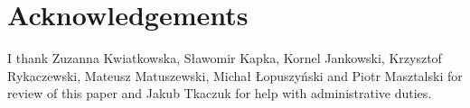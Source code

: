 \documentclass[a4paper]{article}
\begin{document}
\section{Acknowledgements}

I thank Zuzanna Kwiatkowska, Sławomir Kapka, Kornel Jankowski, Krzysztof Rykaczewski, Mateusz Matuszewski, Michał Łopuszyński and Piotr Masztalski for review of this paper and Jakub Tkaczuk for help with administrative duties.





\end{document}
